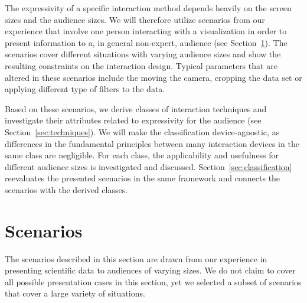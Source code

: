 \documentclass[review,journal]{vgtc}         %
\begin{document}
The expressivity of a specific interaction method depends heavily on the screen sizes and the audience sizes.
We will therefore utilize scenarios from our experience that involve one person interacting with a visualization in order to present information to a, in general non-expert, audience (see Section~\ref{sec:scenario}).
The scenarios cover different situations with varying audience sizes and show the resulting constraints on the interaction design.
Typical parameters that are altered in these scenarios include the moving the camera, cropping the data set or applying different type of filters to the data.

Based on these scenarios, we derive classes of interaction techniques and investigate their attributes related to expressivity for the audience (see Section~\ref{sec:techniques}).
We will make the classification device-agnostic, as differences in the fundamental principles between many interaction devices in the same class are negligible.
For each class, the applicability and usefulness for different audience sizes is investigated and discussed.
Section~\ref{sec:classification} reevaluates the presented scenarios in the same framework and connects the scenarios with the derived classes.

%
%
%
\section{Scenarios} \label{sec:scenario}
The scenarios described in this section are drawn from our experience in presenting scientific data to audiences of varying sizes.
We do not claim to cover all possible presentation cases in this section, yet we selected a subset of scenarios that cover a large variety of situations.

%
%
\end{document}
